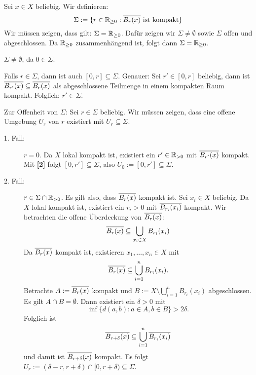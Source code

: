\begin{beweis}[zu (i)]
		Sei $x \in X$ beliebig.
		Wir definieren:
		\[
			\Sigma := \{r \in \mathbb{R}_{\geq 0} : \overline{B_r(x)} \text{ ist kompakt} \}
		\]
		Wir müssen zeigen, dass gilt: $\Sigma = \mathbb{R}_{\geq 0}$.
		Dafür zeigen wir $\Sigma \neq \emptyset$ sowie $\Sigma$ offen und abgeschlossen.
		Da $\mathbb{R}_{\geq 0}$ zusammenhängend ist, folgt dann $\Sigma = \mathbb{R}_{\geq 0}$.
		\begin{enumerate}[{[1]}]
			\item $\Sigma \neq \emptyset$, da $0 \in \Sigma$.
			\item Falls $r \in \Sigma$, dann ist auch $[0,r] \subseteq \Sigma$.
			Genauer:
			Sei $r' \in [0,r]$ beliebig, dann ist $\overline{B_{r'}(x)} \subseteq \overline{B_r(x)}$ als abgeschlossene Teilmenge in einem kompakten Raum kompakt.
			Folglich: $r' \in \Sigma$.
		\end{enumerate}
		
		Zur Offenheit von $\Sigma$:
		Sei $r \in \Sigma$ beliebig.
		Wir müssen zeigen, dass eine offene Umgebung $U_r$ von $r$ existiert mit $U_r \subseteq \Sigma$.
		\begin{description}
			\item[1. Fall:]  $r = 0$.
			Da $X$ lokal kompakt ist, existiert ein $r' \in \mathbb{R}_{>0}$ mit $\overline{B_{r'}(x)}$ kompakt.
			Mit \textbf{[2]} folgt $[0,r'] \subseteq \Sigma$, also $U_0 := [0,r'] \subseteq \Sigma$.
			\item[2. Fall:] $r \in \Sigma \cap \mathbb{R}_{>0}$.
			Es gilt also, dass $\overline{B_r(x)}$ kompakt ist.
			Sei $x_i \in X$ beliebig.
			Da $X$ lokal kompakt ist, existiert ein $r_i > 0$ mit $\overline{B_{r_i}(x_i)}$ kompakt.
			Wir betrachten die offene Überdeckung von $\overline{B_r(x)}$:
			\[
				\overline{B_r(x)} \subseteq \bigcup_{x_i \in X} B_{r_i}(x_i)
			\]
			Da $\overline{B_r(x)}$ kompakt ist, existieren $x_1,\dots,x_n \in X$ mit
			\[
				\overline{B_r(x)} \subseteq \bigcup_{i=1}^n B_{r_i}(x_i).
			\]
			Betrachte $A := \overline{B_r(x)}$ kompakt und $B := X \setminus \bigcup_{i=1}^n B_{r_i}(x_i)$ abgeschlossen.
			Es gilt $A \cap B = \emptyset$. Dann existiert ein $\delta >0$ mit
			\begin{equation}
				\inf\{ d(a,b) : a\in A, b \in B\} > 2 \delta. \label{eq:2.13.!}
			\end{equation}
			Folglich ist
			\[
				\overline{B_{r+\delta}(x)} \subseteq \bigcup_{i=1}^n \overline{B_{r_i}(x_i)}
			\]
			und damit ist $\overline{B_{r+\delta}(x)}$ kompakt.
			Es folgt $U_r := (\delta-r,r+\delta) \cap [0,r+\delta) \subseteq \Sigma$.
			

\end{description}
\end{beweis}
